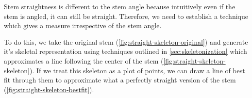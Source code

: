 Stem straightness is different to the stem angle because intuitively even if the stem is angled, it can still be straight. Therefore, we need to establish a technique which gives a measure irrespective of the stem angle.

To do this, we take the original stem (\cref{fig:straight-skeleton-original}) and generate it's skeletal representation using techniques outlined in \cref{sec:skeletonization} which approximates a line following the center of the stem (\cref{fig:straight-skeleton-skeleton}). If we treat this skeleton as a plot of points, we can draw a line of best fit through them to approximate what a perfectly straight version of the stem (\cref{fig:straight-skeleton-bestfit}).

\begin{figure}[h!]
    \centering


\end{figure}
